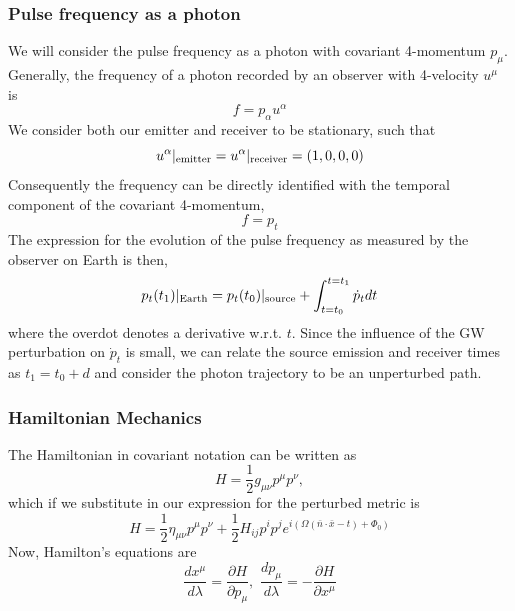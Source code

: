 \documentclass[fleqn,usenatbib,useAMS]{mnras}
\begin{document}
\subsubsection{Pulse frequency as a photon}
\noindent We will consider the pulse frequency as a photon with covariant 4-momentum $p_{\mu}$. Generally, the frequency of a photon recorded by an observer with 4-velocity $u^{\mu}$ is 
\begin{equation}
	f = p_{\alpha} u^{\alpha}
	\label{eq:freq_temporal}
\end{equation}
\noindent We consider both our emitter and receiver to be stationary, such that  
\begin{equation}
	u^{\alpha}|_{\rm emitter} = u^{\alpha}|_{\rm receiver} = (1,0,0,0)
\end{equation}
\noindent Consequently the frequency can be directly identified with the temporal component of the covariant 4-momentum,
\begin{equation}
	f = p_t
\end{equation}
\noindent The expression for the evolution of the pulse frequency as measured by the observer on Earth is then,
\begin{equation}
	p_t(t_1)|_{\rm Earth} = p_t(t_0)|_{\rm source} + \int_{t = t_0}^{t=t_1} \dot{p}_t dt
	\label{eq:integral}
\end{equation}
\noindent where the overdot denotes a derivative w.r.t. $t$. Since the influence of the GW perturbation on $\dot{p}_t$ is small, we can relate the source emission and receiver times as $t_1 = t_0 + d$ and consider the photon trajectory to be an unperturbed path.

\subsubsection{Hamiltonian Mechanics}
The Hamiltonian in covariant notation can be written as 
\begin{equation}
	H = \frac{1}{2} g_{\mu \nu} p^{\mu} p^{\nu},
\end{equation}
\noindent which if we substitute in our expression for the perturbed metric is
\begin{equation}
	H = \frac{1}{2} \eta_{\mu \nu} p^{\mu} p^{\nu} + \frac{1}{2} H_{ij}p^i p^j e^{i(\Omega(\bar{n} \cdot \bar{x} - t) + \Phi_0)	}
\end{equation}
\noindent Now, Hamilton's equations are
\begin{equation}
	\frac{dx^{\mu}}{d\lambda} = \frac{\partial H}{\partial p_{\mu}} , \, \, \frac{dp_{\mu}}{d \lambda} = -\frac{\partial H}{\partial x^{\mu}} 
\end{equation}
\end{document}

